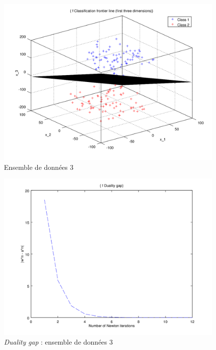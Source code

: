 \documentclass{article}
\begin{document}
         \begin{figure}[H]
           \begin{center}
             \includegraphics[scale=0.5]{images/plane3.png}
             \caption{Ensemble de données 3}
           \end{center}
         \end{figure}

         \begin{figure}[H]
           \begin{center}
             \includegraphics[scale=0.5]{images/duality3.png}
             \caption{\emph{Duality gap} : ensemble de données 3}
           \end{center}
         \end{figure}
\end{document}
